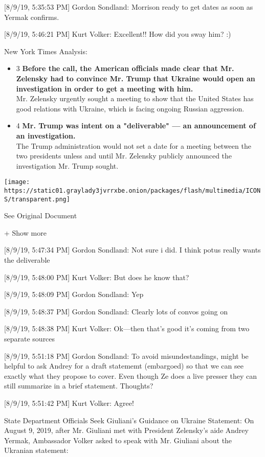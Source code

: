 {[}8/9/19, 5:35:53 PM{]} Gordon Sondland: Morrison ready to get dates as
soon as Yermak confirms.

{[}8/9/19, 5:46:21 PM{]} Kurt Volker: Excellent!! How did you sway him?
:)

New York Times Analysis:

\begin{itemize}
\tightlist
\item
  3 \textbf{Before the call, the American officials made clear that Mr.
  Zelensky had to convince Mr. Trump that Ukraine would open an
  investigation in order to get a meeting with him.}\\
  Mr. Zelensky urgently sought a meeting to show that the United States
  has good relations with Ukraine, which is facing ongoing Russian
  aggression.
\item
  4 \textbf{Mr. Trump was intent on a "deliverable" --- an announcement
  of an investigation.}\\
  The Trump administration would not set a date for a meeting between
  the two presidents unless and until Mr. Zelensky publicly announced
  the investigation Mr. Trump sought.
\end{itemize}

\protect\hyperlink{}{}

\texttt{[image: https://static01.graylady3jvrrxbe.onion/packages/flash/multimedia/ICONS/transparent.png]}

See Original Document

+ Show more

{[}8/9/19, 5:47:34 PM{]} Gordon Sondland: Not sure i did. I think potus
really wants the deliverable

{[}8/9/19, 5:48:00 PM{]} Kurt Volker: But does he know that?

{[}8/9/19, 5:48:09 PM{]} Gordon Sondland: Yep

{[}8/9/19, 5:48:37 PM{]} Gordon Sondland: Clearly lots of convos going
on

{[}8/9/19, 5:48:38 PM{]} Kurt Volker: Ok---then that's good it's coming
from two separate sources

{[}8/9/19, 5:51:18 PM{]} Gordon Sondland: To avoid misundestandings,
might be helpful to ask Andrey for a draft statememt (embargoed) so that
we can see exactly what they propose to cover. Even though Ze does a
live presser they can still summarize in a brief statement. Thoughts?

{[}8/9/19, 5:51:42 PM{]} Kurt Volker: Agree!

State Department Officials Seek Giuliani's Guidance on Ukraine
Statement: On August 9, 2019, after Mr. Giuliani met with President
Zelensky's aide Andrey Yermak, Ambassador Volker asked to speak with Mr.
Giuliani about the Ukranian statement:

